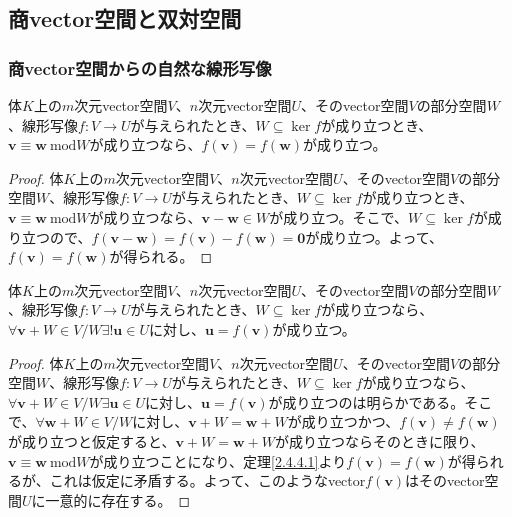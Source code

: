 \documentclass[dvipdfmx]{jsarticle}
\begin{document}
\subsection{商vector空間と双対空間}%
\subsubsection{商vector空間からの自然な線形写像}%
\begin{thm}\label{2.4.4.1}
体$K$上の$m$次元vector空間$V$、$n$次元vector空間$U$、そのvector空間$V$の部分空間$W$、線形写像$f:V \rightarrow U$が与えられたとき、$W \subseteq \ker f$が成り立つとき、$\mathbf{v} \equiv \mathbf{w}\ \mathrm{mod}W$が成り立つなら、$f\left( \mathbf{v} \right) = f\left( \mathbf{w} \right)$が成り立つ。
\end{thm}
\begin{proof}
体$K$上の$m$次元vector空間$V$、$n$次元vector空間$U$、そのvector空間$V$の部分空間$W$、線形写像$f:V \rightarrow U$が与えられたとき、$W \subseteq \ker f$が成り立つとき、$\mathbf{v} \equiv \mathbf{w}\ \mathrm{mod}W$が成り立つなら、$\mathbf{v} - \mathbf{w} \in W$が成り立つ。そこで、$W \subseteq \ker f$が成り立つので、$f\left( \mathbf{v} - \mathbf{w} \right) = f\left( \mathbf{v} \right) - f\left( \mathbf{w} \right) = \mathbf{0}$が成り立つ。よって、$f\left( \mathbf{v} \right) = f\left( \mathbf{w} \right)$が得られる。
\end{proof}
\begin{thm}\label{2.4.4.2}
体$K$上の$m$次元vector空間$V$、$n$次元vector空間$U$、そのvector空間$V$の部分空間$W$、線形写像$f:V \rightarrow U$が与えられたとき、$W \subseteq \ker f$が成り立つなら、$\forall\mathbf{v} + W \in {V}/{W}\exists!\mathbf{u} \in U$に対し、$\mathbf{u} = f\left( \mathbf{v} \right)$が成り立つ。
\end{thm}
\begin{proof}
体$K$上の$m$次元vector空間$V$、$n$次元vector空間$U$、そのvector空間$V$の部分空間$W$、線形写像$f:V \rightarrow U$が与えられたとき、$W \subseteq \ker f$が成り立つなら、$\forall\mathbf{v} + W \in {V}/{W}\exists\mathbf{u} \in U$に対し、$\mathbf{u} = f\left( \mathbf{v} \right)$が成り立つのは明らかである。そこで、$\forall\mathbf{w} + W \in {V}/{W}$に対し、$\mathbf{v} + W = \mathbf{w} + W$が成り立つかつ、$f\left( \mathbf{v} \right) \neq f\left( \mathbf{w} \right)$が成り立つと仮定すると、$\mathbf{v} + W = \mathbf{w} + W$が成り立つならそのときに限り、$\mathbf{v} \equiv \mathbf{w}\ \mathrm{mod}W$が成り立つことになり、定理\ref{2.4.4.1}より$f\left( \mathbf{v} \right) = f\left( \mathbf{w} \right)$が得られるが、これは仮定に矛盾する。よって、このようなvector$f(\mathbf{v})$はそのvector空間$U$に一意的に存在する。
\end{proof}
\end{document}
